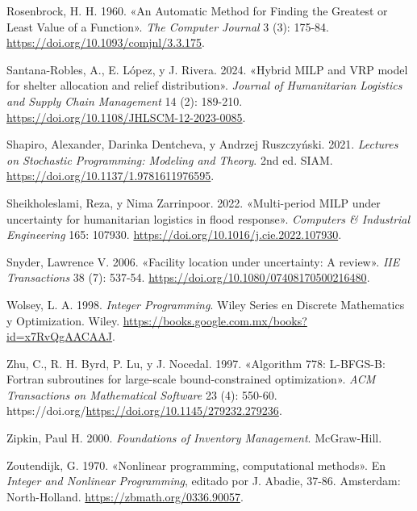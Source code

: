 \documentclass[
  spanish,
  us-letterpaper,
]{scrreprt}
\newlength{\cslhangindent}
\newenvironment{CSLReferences}[2] %
 {\begin{list}{}{%
  \setlength{\itemindent}{0pt}
  \setlength{\leftmargin}{0pt}
  \setlength{\parsep}{0pt}
  \ifodd #1
   \setlength{\leftmargin}{\cslhangindent}
   \setlength{\itemindent}{-1\cslhangindent}
  \fi
  \setlength{\itemsep}{#2\baselineskip}}}
 {\end{list}}
\numberwithin{equation}{section}
\begin{document}
\begin{CSLReferences}{1}{0}
Rosenbrock, H. H. 1960. {«An Automatic Method for Finding the Greatest
or Least Value of a Function»}. \emph{The Computer Journal} 3 (3):
175-84. \url{https://doi.org/10.1093/comjnl/3.3.175}.

Santana-Robles, A., E. López, y J. Rivera. 2024. {«Hybrid MILP and VRP
model for shelter allocation and relief distribution»}. \emph{Journal of
Humanitarian Logistics and Supply Chain Management} 14 (2): 189-210.
\url{https://doi.org/10.1108/JHLSCM-12-2023-0085}.

Shapiro, Alexander, Darinka Dentcheva, y Andrzej Ruszczyński. 2021.
\emph{Lectures on Stochastic Programming: Modeling and Theory}. 2nd ed.
SIAM. \url{https://doi.org/10.1137/1.9781611976595}.

Sheikholeslami, Reza, y Nima Zarrinpoor. 2022. {«Multi-period MILP under
uncertainty for humanitarian logistics in flood response»}.
\emph{Computers \& Industrial Engineering} 165: 107930.
\url{https://doi.org/10.1016/j.cie.2022.107930}.

Snyder, Lawrence V. 2006. {«Facility location under uncertainty: A
review»}. \emph{IIE Transactions} 38 (7): 537-54.
\url{https://doi.org/10.1080/07408170500216480}.

Wolsey, L. A. 1998. \emph{Integer Programming}. Wiley Series en Discrete
Mathematics y Optimization. Wiley.
\url{https://books.google.com.mx/books?id=x7RvQgAACAAJ}.

Zhu, C., R. H. Byrd, P. Lu, y J. Nocedal. 1997. {«Algorithm 778:
L-BFGS-B: Fortran subroutines for large-scale bound-constrained
optimization»}. \emph{ACM Transactions on Mathematical Software} 23 (4):
550-60. https://doi.org/\url{https://doi.org/10.1145/279232.279236}.

Zipkin, Paul H. 2000. \emph{Foundations of Inventory Management}.
McGraw-Hill.

Zoutendijk, G. 1970. {«Nonlinear programming, computational methods»}.
En \emph{Integer and Nonlinear Programming}, editado por J. Abadie,
37-86. Amsterdam: North-Holland. \url{https://zbmath.org/0336.90057}.

\end{CSLReferences}
\end{document}

